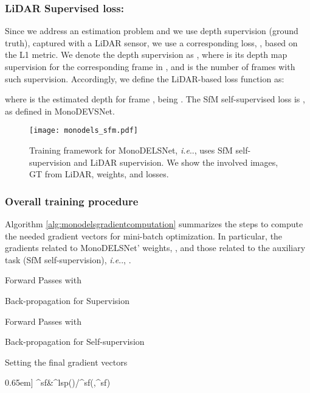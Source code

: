 \documentclass[journal]{IEEEtran}
\makeatletter
\DeclareRobustCommand\onedot{\futurelet\@let@token\@onedot}
\def\@onedot{\ifx\@let@token.\else.\null\fi\xspace}
\def\ie{\emph{i.e}\onedot} \def\Ie{\emph{I.e}\onedot}
\newcommand{\lsupervised}{\mbox{{\scriptsize lsp}}}
\newcommand{\selfsupervised}{\mbox{{\scriptsize sf}}}
\newcommand{\wmde}{\theta}
\newcommand{\waux}{\vartheta}
\newcommand{\wauxself}{\waux^{\selfsupervised}}
\newcommand{\lossequalizer}{\omega}
\newcommand{\selflosseq}{\lossequalizer^{\selfsupervised}}
\makeatother
\begin{document}
\subsubsection{LiDAR Supervised loss: }

Since we address an estimation problem and we use depth supervision (ground truth), captured with a LiDAR sensor, we use a corresponding loss, , based on the L1 metric. We denote the depth supervision as
, 
where  is its depth map supervision for the corresponding frame in , and  is the number of frames with such supervision. Accordingly, we define the LiDAR-based loss function as:



\noindent where  is the estimated depth for frame , being . The SfM self-supervised loss is , as defined in MonoDEVSNet. 

\begin{figure}
    \centering
    \texttt{[image: monodels\_sfm.pdf]}
    \caption{Training framework for MonoDELSNet, {\ie},  uses SfM self-supervision and LiDAR supervision. We show the involved images, GT from LiDAR, weights, and losses. }
    \label{fig:monodels_arch}
\end{figure}

\subsubsection{Overall training procedure} 
\label{ssec:traininprocedure}
Algorithm \ref{alg:monodelsgradientcomputation} summarizes the steps to compute the needed gradient vectors for mini-batch optimization. In particular, the gradients related to MonoDELSNet' weights, , and those related to the auxiliary task (SfM self-supervision), {\ie}, . 


{
\begin{algorithm}
\caption{Computing the gradients ,  for a mini-batch .  refers to back-propagation on  with respect to weights . Analogous for  regarding  and .}
\label{alg:monodelsgradientcomputation}
\end{algorithm}
\begin{minipage}{\columnwidth}
{
\vspace{-0.3cm}
\centering Forward Passes with \par}
\vspace{-0.3cm}

{\centering Back-propagation for Supervision\par}
\vspace{-0.3cm}

{\centering Forward Passes with \par}
\vspace{-0.3cm}

{\centering Back-propagation for Self-supervision\par}
\vspace{-0.3cm}

{\centering Setting the final gradient vectors\par}
\vspace{-0.3cm}
0.65em]
\selflosseq\gets&\ell^{\lsupervised}(\wmde)/\ell^{\selfsupervised}(\wmde,\wauxself)\notag\
\end{minipage}
}
\end{document}
